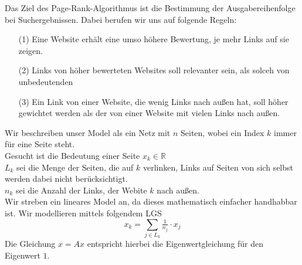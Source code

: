 \documentclass{article}
\begin{document}
    \begin{egbox}
        Das Ziel des Page-Rank-Algorithmus ist die Bestimmung der Ausgabereihenfolge bei Suchergebnissen. Dabei berufen 
        wir uns auf folgende Regeln:
        \begin{enumerate}
            \item[(1)] Eine Website erhält eine umso höhere Bewertung, je mehr Links auf sie zeigen.
            \item[(2)] Links von höher bewerteten Websites soll relevanter sein, als solceh von unbedeutenden
            \item[(3)] Ein Link von einer Website, die wenig Links nach außen hat, soll höher gewichtet werden als der
                von einer Website mit vielen Links nach außen. 
        \end{enumerate}
        Wir beschreiben unser Model als ein Netz mit $n$ Seiten, wobei ein Index $k$ immer für eine Seite steht. \\
        Gesucht ist die Bedeutung einer Seite $x_k\in\mathbb{R}$ \\
        $L_k$ sei die Menge der Seiten, die auf $k$ verlinken, Links auf Seiten von sich selbst werden dabei nicht
        berücksichtigt. \\
        $n_k$ sei die Anzahl der Links, der Webite $k$ nach außen.\\
        Wir streben ein lineares Model an, da dieses mathematisch einfacher handhabbar ist. Wir modellieren mittels
        folgendem LGS
        \[x_k = \sum_{j\in L_k}\tfrac{1}{n_j}\cdot x_j\]
        Die Gleichung $x=Ax$ entspricht hierbei die Eigenwertgleichung für den Eigenwert $1$.
    \end{egbox}
\end{document}

